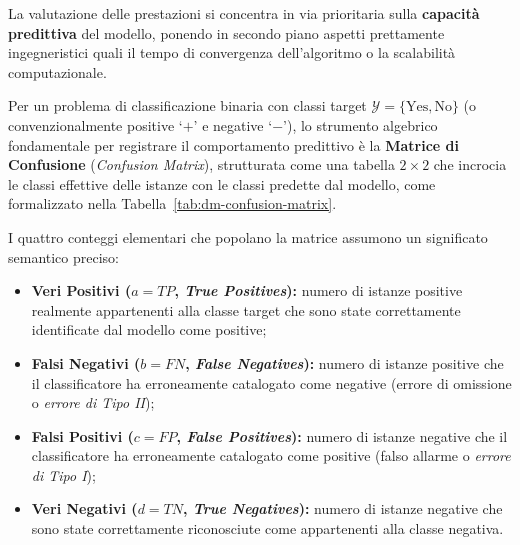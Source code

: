 La valutazione delle prestazioni si concentra in via prioritaria sulla \textbf{capacità predittiva} del modello, ponendo in secondo piano aspetti prettamente ingegneristici quali il tempo di convergenza dell'algoritmo o la scalabilità computazionale.

Per un problema di classificazione binaria con classi target $\mathcal{Y} = \{\text{Yes}, \text{No}\}$ (o convenzionalmente positive `$+$' e negative `$-$'), lo strumento algebrico fondamentale per registrare il comportamento predittivo è la \textbf{Matrice di Confusione} (\textit{Confusion Matrix}), strutturata come una tabella $2 \times 2$ che incrocia le classi effettive delle istanze con le classi predette dal modello, come formalizzato nella Tabella~\ref{tab:dm-confusion-matrix}.

\begin{table}[H]
\centering
\caption{Matrice di confusione per la classificazione binaria.}
\label{tab:dm-confusion-matrix}
\vspace{2mm}
\end{table}

I quattro conteggi elementari che popolano la matrice assumono un significato semantico preciso:
\begin{itemize}
    \item \textbf{Veri Positivi ($a = TP$, \textit{True Positives}):} numero di istanze positive realmente appartenenti alla classe target che sono state correttamente identificate dal modello come positive;
    \item \textbf{Falsi Negativi ($b = FN$, \textit{False Negatives}):} numero di istanze positive che il classificatore ha erroneamente catalogato come negative (errore di omissione o \textit{errore di Tipo II});
    \item \textbf{Falsi Positivi ($c = FP$, \textit{False Positives}):} numero di istanze negative che il classificatore ha erroneamente catalogato come positive (falso allarme o \textit{errore di Tipo I});
    \item \textbf{Veri Negativi ($d = TN$, \textit{True Negatives}):} numero di istanze negative che sono state correttamente riconosciute come appartenenti alla classe negativa.
\end{itemize}

